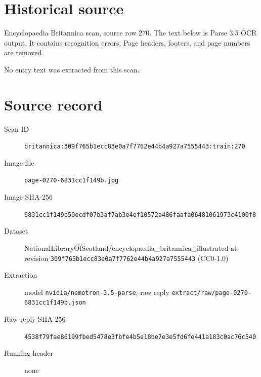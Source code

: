 \documentclass{article}
\begin{document}
\section*{Historical source}
Encyclopaedia Britannica scan, source row 270. The text below is Parse 3.5 OCR output. It contains recognition errors.
Page headers, footers, and page numbers are removed.

No entry text was extracted from this scan.

\section*{Source record}
\begin{description}
\item[Scan ID] \texttt{britannica:309f765b1ecc83e0a7f7762e44b4a927a7555443:train:270}
\item[Image file] \texttt{page-0270-6831cc1f149b.jpg}
\item[Image SHA-256] \texttt{6831cc1f149b50ecdf07b3af7ab3e4ef10572a486faafa06481061973c4100f8}
\item[Dataset] NationalLibraryOfScotland/encyclopaedia\_britannica\_illustrated at revision \texttt{309f765b1ecc83e0a7f7762e44b4a927a7555443} (CC0-1.0)
\item[Extraction] model \texttt{nvidia/nemotron-3.5-parse}, raw reply \texttt{extract/raw/page-0270-6831cc1f149b.json}
\item[Raw reply SHA-256] \texttt{4538f79fae86199fbed5478e3fbfe4b5e18be7e3e5fd6fe441a183c0ac76c540}

\item[Running header] none
\end{description}
\end{document}
